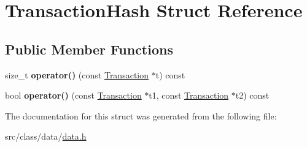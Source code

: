 \hypertarget{struct_transaction_hash}{}\section{Transaction\+Hash Struct Reference}
\label{struct_transaction_hash}
\subsection*{Public Member Functions}
\begin{DoxyCompactItemize}
\item 
\hypertarget{struct_transaction_hash_af0e0edc370fb33fdb08221018fbed3be}{}size\+\_\+t {\bfseries operator()} (const \hyperlink{class_transaction}{Transaction} $\ast$t) const \label{struct_transaction_hash_af0e0edc370fb33fdb08221018fbed3be}

\item 
\hypertarget{struct_transaction_hash_ac6abbdfc79d5360f052e9bdb2c2edd50}{}bool {\bfseries operator()} (const \hyperlink{class_transaction}{Transaction} $\ast$t1, const \hyperlink{class_transaction}{Transaction} $\ast$t2) const \label{struct_transaction_hash_ac6abbdfc79d5360f052e9bdb2c2edd50}

\end{DoxyCompactItemize}


The documentation for this struct was generated from the following file\+:\begin{DoxyCompactItemize}
\item 
src/class/data/\hyperlink{data_8h}{data.\+h}\end{DoxyCompactItemize}
